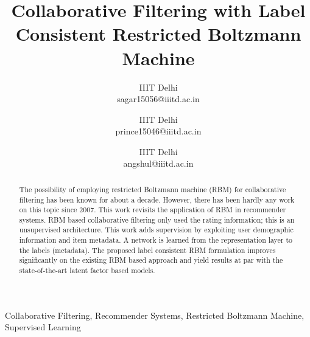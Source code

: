 \documentclass[conference]{IEEEtran}
\begin{document}
\title{Collaborative Filtering with Label Consistent Restricted Boltzmann Machine}


\author{
IIIT Delhi\\
sagar15056@iiitd.ac.in
\and
{}
IIIT Delhi\\
prince15046@iiitd.ac.in
\and
{}
IIIT Delhi\\
angshul@iiitd.ac.in
}


\maketitle


\IEEEpubidadjcol

\begin{abstract}
The possibility of employing restricted Boltzmann machine (RBM) for collaborative filtering has been known for about a decade. However, there has been hardly any work on this topic since 2007. This work revisits the application of RBM in recommender systems. RBM based collaborative filtering only used the rating information; this is an unsupervised architecture. This work adds supervision by exploiting user demographic information and item metadata. A network is learned from the representation layer to the labels (metadata). The proposed label consistent RBM formulation improves significantly on the existing RBM based approach and yield results at par with the state-of-the-art latent factor based models.
\end{abstract}



\begin{IEEEkeywords}
Collaborative Filtering, Recommender Systems, Restricted Boltzmann Machine, Supervised Learning
\end{IEEEkeywords}
\end{document}
